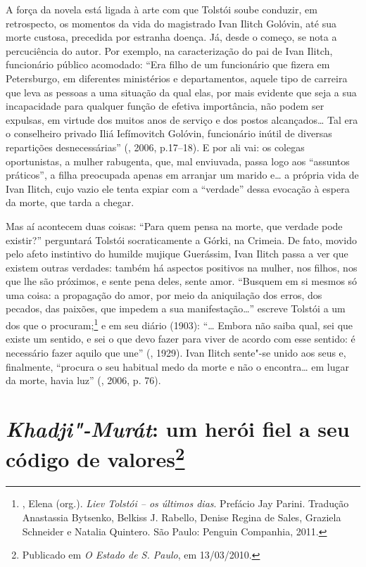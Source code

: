 A força da novela está ligada à arte com que
Tolstói soube conduzir, em retrospecto, os momentos da vida do
magistrado Ivan Ilitch Golóvin, até sua morte custosa, precedida
por estranha doença. Já, desde o começo, se nota a percuciência
do autor. Por exemplo, na caracterização do pai de Ivan Ilitch,
funcionário público acomodado: ``Era filho de um funcionário que
fizera em Petersburgo, em
diferentes ministérios e departamentos, aquele tipo de
carreira que leva as pessoas a uma situação da qual elas,
por mais evidente que seja a sua incapacidade para qualquer
função de efetiva importância, não podem ser expulsas, em
virtude dos muitos anos de serviço e dos postos alcançados\ldots{}
Tal era o conselheiro privado Iliá Iefímovitch Golóvin,
funcionário inútil de diversas repartições  desnecessárias''
(, 2006, p.17--18). E por ali vai: os colegas
oportunistas, a mulher rabugenta, que, mal enviuvada, passa
logo aos ``assuntos práticos'', a filha preocupada apenas em
arranjar um marido e\ldots{} a própria vida de Ivan Ilitch,
cujo vazio ele tenta expiar com a ``verdade'' dessa evocação
à espera da morte, que tarda a chegar. 

Mas aí acontecem duas coisas: ``Para quem pensa na morte, que
verdade pode existir?'' perguntará Tolstói socraticamente a
Górki, na Crimeia. De fato, movido pelo afeto instintivo do
humilde mujique Guerássim, Ivan Ilitch passa a ver que
existem outras verdades: também há aspectos positivos na
mulher, nos filhos, nos que lhe são próximos, e sente pena
deles, sente amor. ``Busquem em si mesmos só uma coisa: a
propagação do amor, por meio da aniquilação dos erros, dos
pecados, das paixões, que impedem a sua manifestação\ldots{}''
escreve Tolstói a um dos que o
procuram;\footnote{, Elena (org.). \emph{Liev
Tolstói -- os últimos dias}. Prefácio Jay Parini. Tradução
Anastassia Bytsenko, Belkiss J. Rabello, Denise Regina de
Sales, Graziela Schneider e Natalia Quintero. São Paulo:
Penguin Companhia, 2011.} e em seu diário (1903): ``\ldots{}
Embora não saiba qual, sei que existe um sentido, e sei o que
devo fazer para viver de acordo com esse sentido: é necessário
fazer aquilo que une'' (, 1929). Ivan Ilitch
sente"-se unido aos seus e, finalmente, ``procura o seu habitual
medo da morte e não o encontra\ldots{} em lugar da morte, havia
luz'' (, 2006, p. 76).

\chapter{\emph{Khadji"-Murát}: um herói fiel a seu código de
valores\footnote{Publicado em \emph{O Estado de S. Paulo}, em
  13/03/2010.}}

